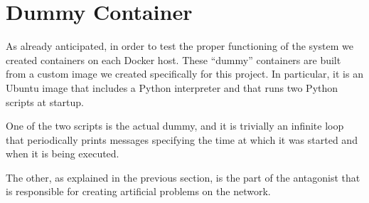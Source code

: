 \section{Dummy Container}
As already anticipated, in order to test the proper functioning of the system we created containers on each Docker host. These “dummy” containers are built from a custom image we created specifically for this project. In particular, it is an Ubuntu image that includes a Python interpreter and that runs two Python scripts at startup.

One of the two scripts is the actual dummy, and it is trivially an infinite loop that periodically prints messages specifying the time at which it was started and when it is being executed.

The other, as explained in the previous section, is the part of the antagonist that is responsible for creating artificial problems on the network.
